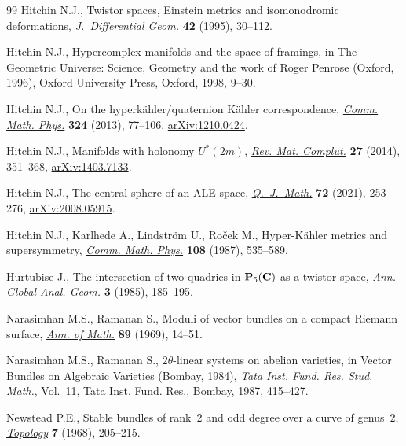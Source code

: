 \begin{thebibliography}{99}
Hitchin N.J., Twistor spaces, {E}instein metrics and isomonodromic
 deformations, \href{https://doi.org/10.4310/jdg/1214457032}{\textit{J.~Differential Geom.}} \textbf{42} (1995), 30--112.

Hitchin N.J., Hypercomplex manifolds and the space of framings, in The
 Geometric Universe: Science, Geometry and the work of Roger Penrose
 ({O}xford, 1996), Oxford University Press, Oxford, 1998, 9--30.

Hitchin N.J., On the hyperk\"ahler/quaternion {K}\"ahler correspondence,
 \href{https://doi.org/10.1007/s00220-013-1689-y}{\textit{Comm. Math. Phys.}} \textbf{324} (2013), 77--106, \href{https://arxiv.org/abs/1210.0424}{arXiv:1210.0424}.

Hitchin N.J., Manifolds with holonomy {$U^*(2m)$}, \href{https://doi.org/10.1007/s13163-014-0150-x}{\textit{Rev. Mat. Complut.}}
 \textbf{27} (2014), 351--368, \href{https://arxiv.org/abs/1403.7133}{arXiv:1403.7133}.

Hitchin N.J., The central sphere of an {ALE} space, \href{https://doi.org/10.1093/qmath/haaa051}{\textit{Q.~J.~Math.}}
 \textbf{72} (2021), 253--276, \href{https://arxiv.org/abs/2008.05915}{arXiv:2008.05915}.

Hitchin N.J., Karlhede A., Lindstr\"om U., Ro\v{c}ek M., Hyper-{K}\"ahler
 metrics and supersymmetry, \href{https://doi.org/10.1007/BF01214418}{\textit{Comm. Math. Phys.}} \textbf{108} (1987),
 535--589.

Hurtubise J., The intersection of two quadrics in {${\bf P}_5({\bf C})$} as a
 twistor space, \href{https://doi.org/10.1007/BF01000339}{\textit{Ann. Global Anal. Geom.}} \textbf{3} (1985), 185--195.

Narasimhan M.S., Ramanan S., Moduli of vector bundles on a compact {R}iemann
 surface, \href{https://doi.org/10.2307/1970807}{\textit{Ann. of Math.}} \textbf{89} (1969), 14--51.

Narasimhan M.S., Ramanan S., {$2\theta$}-linear systems on abelian varieties,
 in Vector Bundles on Algebraic Varieties ({B}ombay, 1984), \textit{Tata Inst.
 Fund. Res. Stud. Math.}, Vol.~11, Tata Inst. Fund. Res., Bombay, 1987,
 415--427.

Newstead P.E., Stable bundles of rank~{$2$} and odd degree over a curve of
 genus~{$2$}, \href{https://doi.org/10.1016/0040-9383(68)90001-3}{\textit{Topology}} \textbf{7} (1968), 205--215.


\end{thebibliography}
